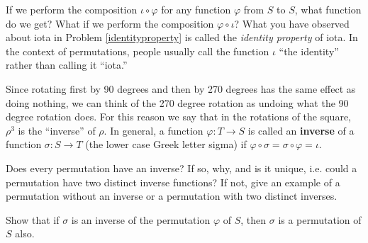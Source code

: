 \iteme If we perform the composition $\iota\circ \varphi$ for any function
$\varphi$ from $S$ to $S$, what function do we get?  What if we perform the
composition $\varphi\circ\iota$?\label{identityproperty}
\solution{$\iota\circ\varphi=\varphi\circ\iota=\varphi$}
\ep
What you have observed about iota in Problem \ref{identityproperty} is
called the {\em identity property} of iota.  In the context of permutations, people usually
call the function
$\iota$ ``the identity'' rather than calling it ``iota.''

Since rotating first by 90 degrees and then by 270 degrees has the same
effect as doing nothing, we can think of the 270 degree rotation as
undoing what the 90 degree rotation does.  For this reason we say that in
the rotations of the square, $\rho^3$ is the ``inverse'' of $\rho$.  In
general, a function $\varphi:T\rightarrow S$ is called an {\bf
inverse} of a function $\sigma:S
\rightarrow T$ (the lower case Greek letter sigma) if $\varphi\circ \sigma= \sigma
\circ\varphi =
\iota$. 

\bp
\iteme Does every permutation have an inverse?   If so, why, and is it
unique, i.e. could a permutation have two distinct inverse functions?  If
not, give an example of a permutation without an inverse or a permutation with two
distinct inverses.

 \iteme  Show that if $\sigma$ is an inverse of the permutation
$\varphi$  of
$S$, then $\sigma$ is a permutation of $S$ also. 

\ep

